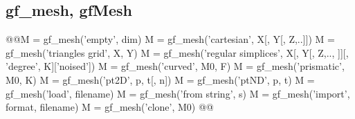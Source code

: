 \subsection{gf\_mesh, gfMesh}
\begin{synopsis}
@@M = gf_mesh('empty', \tint dim) 
M = gf_mesh('cartesian', \tvec X[, \tvec Y[, \tvec Z,..]])
M = gf_mesh('triangles grid', \tvec X, \tvec Y)
M = gf_mesh('regular simplices', \tvec X[, \tvec Y[, \tvec Z,.., ]][, 'degree', \tint K]['noised'])
M = gf_mesh('curved', \tcmesh M0, \tvec F)
M = gf_mesh('prismatic', \tcmesh M0, \tint K)
M = gf_mesh('pt2D', \tmat p, \timat t[, \tint n])
M = gf_mesh('ptND', \tmat p, \timat t)
M = gf_mesh('load', \tstr filename)
M = gf_mesh('from string', \tstr s)
M = gf_mesh('import', \tstr format, \tstr filename)
M = gf_mesh('clone', \tcmesh M0)
@@\end{synopsis}
